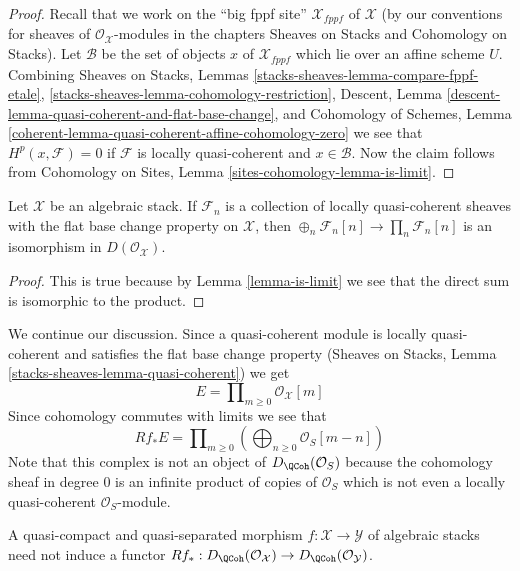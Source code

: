 \begin{proof}
Recall that we work on the ``big fppf site'' $\mathcal{X}_{fppf}$
of $\mathcal{X}$ (by our conventions
for sheaves of $\mathcal{O}_\mathcal{X}$-modules in the chapters
Sheaves on Stacks and Cohomology on Stacks). Let $\mathcal{B}$ be the set
of objects $x$ of $\mathcal{X}_{fppf}$ which lie over an affine scheme $U$. 
Combining
Sheaves on Stacks, Lemmas
\ref{stacks-sheaves-lemma-compare-fppf-etale},
\ref{stacks-sheaves-lemma-cohomology-restriction},
Descent, Lemma \ref{descent-lemma-quasi-coherent-and-flat-base-change},
and
Cohomology of Schemes, Lemma
\ref{coherent-lemma-quasi-coherent-affine-cohomology-zero}
we see that $H^p(x, \mathcal{F}) = 0$ if $\mathcal{F}$ is
locally quasi-coherent and $x \in \mathcal{B}$.
Now the claim follows from
Cohomology on Sites, Lemma \ref{sites-cohomology-lemma-is-limit}.
\end{proof}

\begin{lemma}
\label{lemma-sum-is-product}
Let $\mathcal{X}$ be an algebraic stack. If $\mathcal{F}_n$ is a collection
of locally quasi-coherent sheaves with the flat base change property on
$\mathcal{X}$, then $\oplus_n \mathcal{F}_n[n] \to \prod_n \mathcal{F}_n[n]$
is an isomorphism in $D(\mathcal{O}_\mathcal{X})$.
\end{lemma}

\begin{proof}
This is true because by Lemma \ref{lemma-is-limit} we see that the direct sum
is isomorphic to the product.
\end{proof}

\noindent
We continue our discussion. Since a quasi-coherent module is locally
quasi-coherent and satisfies the flat base change property
(Sheaves on Stacks, Lemma \ref{stacks-sheaves-lemma-quasi-coherent}) we get
$$
E = \prod\nolimits_{m \geq 0} \mathcal{O}_\mathcal{X}[m]
$$
Since cohomology commutes
with limits we see that
$$
Rf_*E = \prod\nolimits_{m \geq 0}
\left(\bigoplus\nolimits_{n \geq 0} \mathcal{O}_S[m - n]\right)
$$
Note that this complex is not an object of $D_\QCoh(\mathcal{O}_S)$
because the cohomology sheaf in degree $0$ is an infinite product of copies
of $\mathcal{O}_S$ which is not even a locally quasi-coherent
$\mathcal{O}_S$-module.

\begin{lemma}
\label{lemma-push-not-OK}
A quasi-compact and quasi-separated morphism
$f : \mathcal{X} \to \mathcal{Y}$ of algebraic stacks
need not induce a functor
$Rf_* : D_\QCoh(\mathcal{O}_\mathcal{X}) \to
D_\QCoh(\mathcal{O}_\mathcal{Y})$.
\end{lemma}

